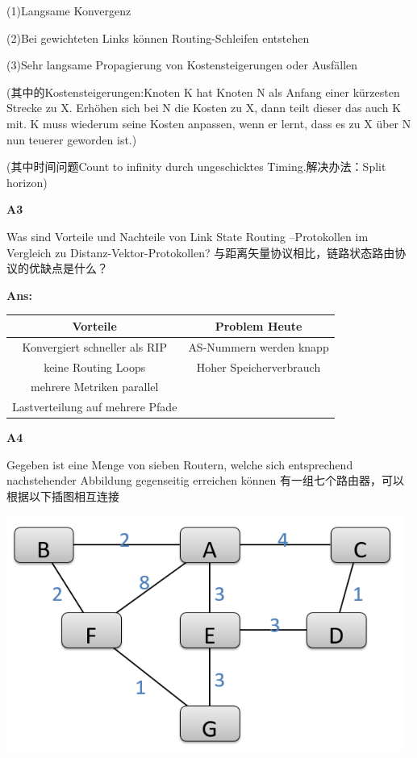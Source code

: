 \documentclass[fleqn]{article}
\begin{document}
(1)Langsame Konvergenz

(2)Bei gewichteten Links können Routing-Schleifen entstehen

(3)Sehr langsame Propagierung von Kostensteigerungen oder Ausfällen

\indent\indent(其中的Kostensteigerungen:Knoten K hat Knoten N als Anfang einer kürzesten Strecke zu X. Erhöhen sich bei N die Kosten zu X, dann teilt dieser das auch K mit. K muss wiederum seine Kosten anpassen, wenn er lernt, dass es zu X über N nun teuerer geworden ist.)

\indent\indent(其中时间问题Count to infinity durch ungeschicktes Timing.解决办法：Split horizon)

\noindent\textbf{A3}

Was sind Vorteile und Nachteile von Link State Routing –Protokollen im Vergleich zu Distanz-Vektor-Protokollen?
与距离矢量协议相比，链路状态路由协议的优缺点是什么？

\textbf{Ans:}

\begin{center}
    \begin{tabular}{c|c}
        Vorteile&Problem Heute\\
        \hline
        Konvergiert schneller als RIP&AS-Nummern werden knapp\\
        keine Routing Loops&Hoher Speicherverbrauch\\
        mehrere Metriken parallel\\
        Lastverteilung auf mehrere Pfade
    \end{tabular}
\end{center}


\noindent\textbf{A4}

Gegeben ist eine Menge von sieben Routern, welche sich entsprechend nachstehender Abbildung gegenseitig erreichen können
有一组七个路由器，可以根据以下插图相互连接

\begin{center}
    \includegraphics[scale=0.5]{bild10.png}
\end{center}
\end{document}

